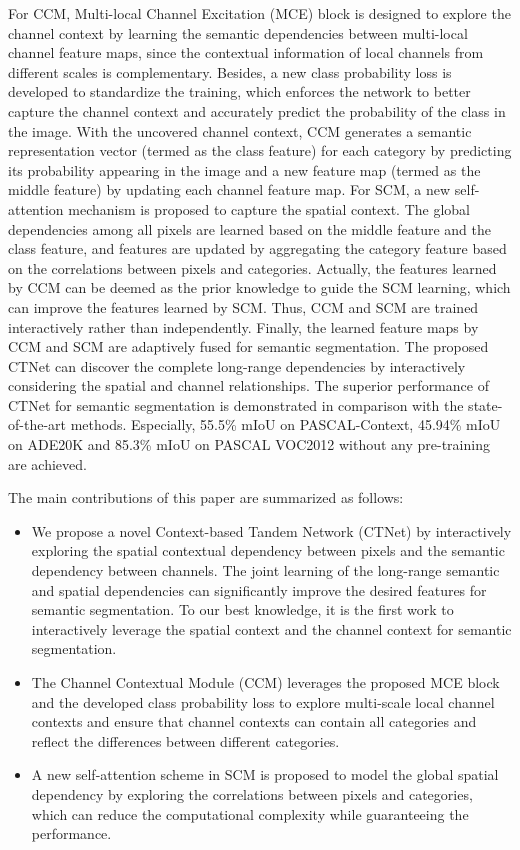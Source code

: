 \documentclass[10pt,journal,cspaper,compsoc]{IEEEtran}
\begin{document}
For CCM, Multi-local Channel Excitation (MCE) block is designed to explore the channel context by learning the semantic dependencies between multi-local channel feature maps, since the contextual information of local channels from different scales is complementary. Besides, a new class probability loss is developed to standardize the training, which enforces the network to better capture the channel context and accurately predict the probability of the class in the image. With the uncovered channel context, CCM generates a semantic representation vector (termed as the class feature) for each category by predicting its probability appearing in the image and a new feature map (termed as the middle feature) by updating each channel feature map. For SCM, a new self-attention mechanism is proposed to capture the spatial context. The global dependencies among all pixels are learned based on the middle feature and the class feature, and features are updated by aggregating the category feature based on the correlations between pixels and categories. Actually, the features learned by CCM can be deemed as the prior knowledge to guide the SCM learning, which can improve the features learned by SCM. Thus, CCM and SCM are trained interactively rather than independently. Finally, the learned feature maps by CCM and SCM are adaptively fused for semantic segmentation. The proposed CTNet can discover the complete long-range dependencies by interactively considering the spatial and channel relationships. The superior performance of CTNet for semantic segmentation is demonstrated in comparison with the state-of-the-art methods. Especially, 55.5\% mIoU on PASCAL-Context, 45.94\% mIoU on ADE20K and 85.3\% mIoU on PASCAL VOC2012 without any pre-training are achieved.
	
The main contributions of this paper are summarized as follows:
\begin{itemize}
\item We propose a novel Context-based Tandem Network (CTNet) by interactively exploring the spatial contextual dependency between pixels and the semantic dependency between channels. The joint learning of the long-range semantic and spatial dependencies can significantly improve the desired features for semantic segmentation. To our best knowledge, it is the first work to interactively leverage the spatial context and the channel context for semantic segmentation.
\item The Channel Contextual Module (CCM) leverages the proposed MCE block and the developed class probability loss to explore multi-scale local channel contexts and ensure that channel contexts can contain all categories and reflect the differences between different categories.
\item A new self-attention scheme in SCM is proposed to model the global spatial dependency by exploring the correlations between pixels and categories, which can reduce the computational complexity while guaranteeing the performance.
\end{itemize}
	
\end{document}
